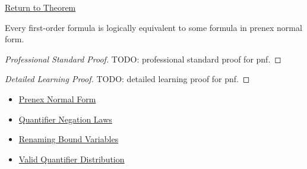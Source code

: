 \newpage
{}
\label{prf:pnf}

\begin{remark*}[Return]
\hyperref[thm:pnf]{Return to Theorem}
\end{remark*}

\begin{theorem*}
Every first-order formula is logically equivalent to some formula in prenex
normal form.
\end{theorem*}

\begin{proof}[Professional Standard Proof]
\LRAProofBodyStart
TODO: professional standard proof for pnf.
\end{proof}

\begin{proof}[Detailed Learning Proof]
\LRAProofBodyStart
TODO: detailed learning proof for pnf.
\end{proof}

\begin{remark*}
\end{remark*}

\begin{dependencies}
\begin{itemize}
  \item \hyperref[def:pnf]{Prenex Normal Form}
  \item \hyperref[thm:qneg]{Quantifier Negation Laws}
  \item \hyperref[thm:rename]{Renaming Bound Variables}
  \item \hyperref[thm:qdist]{Valid Quantifier Distribution}
\end{itemize}
\end{dependencies}

\clearpage
